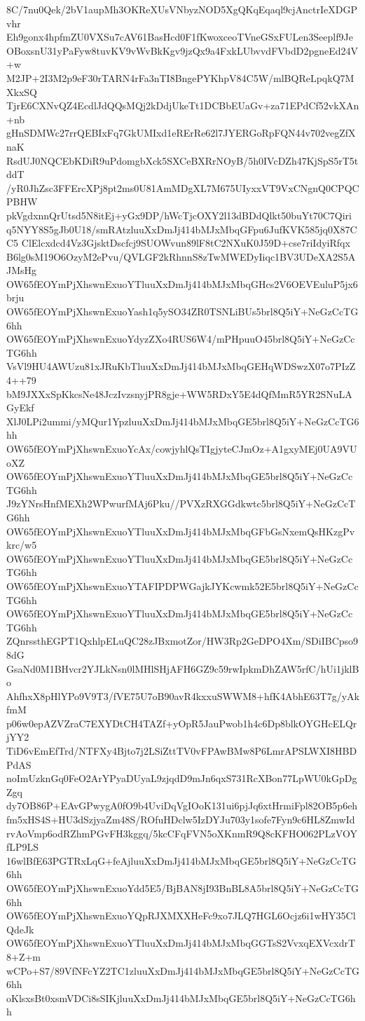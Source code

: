 8C/7nu0Qek/2bV1aupMh3OKReXUsVNbyzNOD5XgQKqEqaql9cjAnctrIeXDGPvhr
Eh9gonx4hpfmZU0VXSu7cAV61BasHcd0F1fKwoxceoTVneGSxFULen3Seeplf9Je
OBoxsnU31yPaFyw8tuvKV9vWvBkKgv9jzQx9a4FxkLUbvvdFVbdD2pgneEd24V+w
M2JP+2I3M2p9eF30rTARN4rFa3nTI8BngePYKhpV84C5W/mlBQReLpqkQ7MXkxSQ
TjrE6CXNvQZ4EcdlJdQQsMQj2kDdjUkeTt1DCBbEUaGv+za71EPdCf52vkXAn+nb
gHnSDMWc27rrQEBIxFq7GkUMIxd1eRErRe62l7JYERGoRpFQN44v702vegZfXnaK
RsdUJ0NQCEbKDiR9uPdomgbXck5SXCeBXRrNOyB/5h0IVcDZh47KjSpS5rT5tddT
/yR0JhZsc3FFErcXPj8pt2ms0U81AmMDgXL7M675UIyxxVT9VxCNgnQ0CPQCPBHW
pkVgdxnnQrUtsd5N8itEj+yGx9DP/hWcTjcOXY2l13dBDdQlkt50buYt70C7Qiri
q5NYY8S5gJb0U18/smRAtzluuXxDmJj414bMJxMbqGFpu6JufKVK585jq0X87CC5
ClElcxdcd4Vz3GjsktDscfcj9SUOWvun89lF8tC2NXuK0J59D+cse7riIdyiRfqx
B6lg0sM19O6OzyM2ePvu/QVLGF2kRhnnS8zTwMWEDyIiqc1BV3UDeXA2S5AJMsHg
OW65fEOYmPjXhswnExuoYTluuXxDmJj414bMJxMbqGHcs2V6OEVEuluP5jx6brju
OW65fEOYmPjXhswnExuoYash1q5ySO34ZR0TSNLiBUs5brl8Q5iY+NeGzCcTG6hh
OW65fEOYmPjXhswnExuoYdyzZXo4RUS6W4/mPHpuuO45brl8Q5iY+NeGzCcTG6hh
VsVl9HU4AWUzu81xJRuKbTluuXxDmJj414bMJxMbqGEHqWDSwzX07o7PIzZ4++79
bM9JXXxSpKkcsNe48JczIvzsnyjPR8gje+WW5RDxY5E4dQfMmR5YR2SNuLAGyEkf
XlJ0LPi2ummi/yMQur1YpzluuXxDmJj414bMJxMbqGE5brl8Q5iY+NeGzCcTG6hh
OW65fEOYmPjXhswnExuoYcAx/cowjyhlQsTIgjyteCJmOz+A1gxyMEj0UA9VUoXZ
OW65fEOYmPjXhswnExuoYTluuXxDmJj414bMJxMbqGE5brl8Q5iY+NeGzCcTG6hh
J9zYNrsHnfMEXh2WPwurfMAj6Pku//PVXzRXGGdkwtc5brl8Q5iY+NeGzCcTG6hh
OW65fEOYmPjXhswnExuoYTluuXxDmJj414bMJxMbqGFbGsNxemQsHKzgPvkrc/w5
OW65fEOYmPjXhswnExuoYTluuXxDmJj414bMJxMbqGE5brl8Q5iY+NeGzCcTG6hh
OW65fEOYmPjXhswnExuoYTAFIPDPWGajkJYKcwmk52E5brl8Q5iY+NeGzCcTG6hh
OW65fEOYmPjXhswnExuoYTluuXxDmJj414bMJxMbqGE5brl8Q5iY+NeGzCcTG6hh
ZQnrssthEGPT1QxhlpELuQC28zJBxmotZor/HW3Rp2GeDPO4Xm/SDiIBCpso98dG
GsaNd0M1BHvcr2YJLkNsn0lMHlSHjAFH6GZ9c59rwIpkmDhZAW5rfC/hUi1jklBo
AhfhxX8pHlYPo9V9T3/fVE75U7oB90avR4kxxuSWWM8+hfK4AbhE63T7g/yAkfmM
p06w0epAZVZraC7EXYDtCH4TAZf+yOpR5JauPwob1h4c6Dp8blkOYGHcELQrjYY2
TiD6vEmEfTrd/NTFXy4Bjto7j2LSiZttTV0vFPAwBMw8P6LmrAPSLWXI8HBDPdAS
noImUzknGq0FeO2ArYPyaDUyaL9zjqdD9mJn6qxS731RcXBon77LpWU0kGpDgZgq
dy7OB86P+EAvGPwygA0fO9b4UviDqVgIOoK131ui6pjJq6xtHrmiFpl82OB5p6eh
fm5xHS4S+HU3dSzjyaZm48S/ROfuHDclw5IzDYJu703y1sofe7Fyn9c6HL8ZmwId
rvAoVmp6odRZhmPGvFH3kggq/5kcCFqFVN5oXKnmR9Q8cKFHO062PLzVOYfLP9LS
16wlBfE63PGTRxLqG+feAjluuXxDmJj414bMJxMbqGE5brl8Q5iY+NeGzCcTG6hh
OW65fEOYmPjXhswnExuoYdd5E5/BjBAN8jI93BnBL8A5brl8Q5iY+NeGzCcTG6hh
OW65fEOYmPjXhswnExuoYQpRJXMXXHeFc9xo7JLQ7HGL6Ocjz6i1wHY35ClQdeJk
OW65fEOYmPjXhswnExuoYTluuXxDmJj414bMJxMbqGGTsS2VvxqEXVcxdrT8+Z+m
wCPo+S7/89VfNFcYZ2TC1zluuXxDmJj414bMJxMbqGE5brl8Q5iY+NeGzCcTG6hh
oKlsxsBt0xsmVDCi8sSIKjluuXxDmJj414bMJxMbqGE5brl8Q5iY+NeGzCcTG6hh
